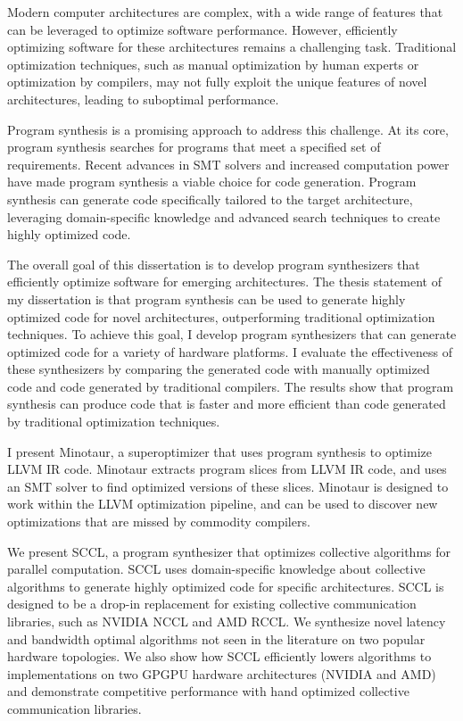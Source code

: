 Modern computer architectures are complex, with a wide range of
features that can be leveraged to optimize software performance.
However, efficiently optimizing software for these architectures
remains a challenging task. Traditional optimization techniques,
such as manual optimization by human experts or optimization by
compilers, may not fully exploit the unique features of novel
architectures, leading to suboptimal performance.

Program synthesis is a promising approach to address this challenge.
At its core, program synthesis searches for programs that meet a
specified set of requirements. Recent advances in SMT solvers and
increased computation power have made program synthesis a viable
choice for code generation. Program synthesis can generate code
specifically tailored to the target architecture, leveraging
domain-specific knowledge and advanced search techniques to create
highly optimized code.

The overall goal of this dissertation is to develop program
synthesizers that efficiently optimize software for emerging
architectures. The thesis statement of my dissertation is that program
synthesis can be used to generate highly optimized code for novel
architectures, outperforming traditional optimization techniques. To
achieve this goal, I develop program synthesizers that can
generate optimized code for a variety of hardware platforms. I
evaluate the effectiveness of these synthesizers by comparing the
generated code with manually optimized code and code generated by
traditional compilers. The results show that program synthesis can
produce code that is faster and more efficient than code generated by
traditional optimization techniques.

I present Minotaur, a superoptimizer that uses program synthesis
to optimize LLVM IR code. Minotaur extracts program slices from LLVM IR
code, and uses an SMT solver to find optimized versions of these slices.
Minotaur is designed to work within the LLVM optimization pipeline, and
can be used to discover new optimizations that are missed by commodity
compilers.

We present SCCL, a program synthesizer that optimizes collective
algorithms for parallel computation. SCCL uses domain-specific knowledge
about collective algorithms to generate highly optimized code for
specific architectures. SCCL is designed to be a drop-in replacement for
existing collective communication libraries, such as NVIDIA NCCL and AMD RCCL.
We synthesize novel latency and bandwidth optimal algorithms not seen
in the literature on two popular hardware topologies. We also show how
SCCL efficiently lowers algorithms to implementations on two GPGPU
hardware architectures (NVIDIA and AMD) and demonstrate competitive
performance with hand optimized collective communication libraries.